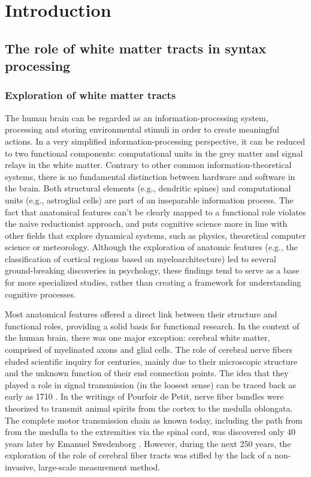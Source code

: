 \chapter{Introduction}

\section{The role of white matter tracts in syntax processing}

\subsection{Exploration of white matter tracts}
The human brain can be regarded as an information-processing system, processing and storing environmental stimuli in order to create meaningful actions. 
In a very simplified information-processing perspective, it can be reduced to two functional components: computational units in the grey matter and signal relays in the white matter.
Contrary to other common information-theoretical systems, there is no fundamental distinction between hardware and software in the brain.
Both structural elements (e.g., dendritic spines) and computational units (e.g., astroglial cells) are part of an inseparable information process.
The fact that anatomical features can't be clearly mapped to a functional role violates the naive reductionist approach, and puts cognitive science more in line with other fields that explore dynamical systems, such as physics, theoretical computer science or meteorology.
Although the exploration of anatomic features (e.g., the classification of cortical regions based on myeloarchitecture) led to several ground-breaking discoveries in psychology, these findings tend to serve as a base for more specialized studies, rather than creating a framework for understanding cognitive processes.

Most anatomical features offered a direct link between their structure and functional roles, providing a solid basis for functional research.
In the context of the human brain, there was one major exception: cerebral white matter, comprised of myelinated axons and glial cells.
The role of cerebral nerve fibers eluded scientific inquiry for centuries, mainly due to their microscopic structure and the unknown function of their end connection points.
The idea that they played a role in signal transmission (in the loosest sense) can be traced back as early as 1710 \cite{1.1.history}.
In the writings of Pourfoir de Petit, nerve fiber bundles were theorized to transmit animal spirits from the cortex to the medulla oblongata.
The complete motor transmission chain as known today, including the path from from the medulla to the extremities via the spinal cord, was discovered only 40 years later by Emanuel Swedenborg \cite{1.1.history}.
However, during the next 250 years, the exploration of the role of cerebral fiber tracts was stifled by the lack of a non-invasive, large-scale measurement method.

